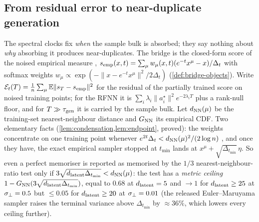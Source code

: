 \subsection{From residual error to near-duplicate generation}
\label{sec:theory-bridge}\label{sec:theory-fraction}\label{sec:theory-mem}

The spectral clocks fix \emph{when} the sample bulk is absorbed; they say nothing about \emph{why} absorbing it produces near-duplicates. The bridge is the closed-form score of the noised empirical measure \citep{scarvelis2023closedform,gu2023memorization}, $s_{\rm emp}(x,t)=\sum_\mu w_\mu(x,t)(e^{-t}x^\mu-x)/\Delta_t$ with softmax weights $w_\mu\propto\exp(-\|x-e^{-t}x^\mu\|^2/2\Delta_t)$ (\cref{def:bridge-objects}). Write $\mathcal E_t(T)=\tfrac1{n}\sum_\mu\mathbb{E}\|s_T-s_{\rm emp}\|^2$ for the residual of the partially trained score on noised training points; for the RFNN it is $\sum_i\lambda_i\|a_i^\star\|^2e^{-2\lambda_iT}$ plus a rank-null floor, and for $T\gg\tau_{\mathrm{gen}}$ it is carried by the sample bulk. Let $d_{\rm NN}(\mu)$ be the training-set nearest-neighbour distance and $G_{\rm NN}$ its empirical CDF. Two elementary facts (\cref{lem:condensation,lem:endpoint}, proved): the weights concentrate on one training point whenever $e^{2t}\Delta_t<d_{\rm NN}(\mu)^2/(2\log n)$ \citep{biroli2024dynamical}, and once they have, the exact empirical sampler stopped at $t_{\min}$ lands at $x^\mu+\sqrt{\Delta_{t_{\min}}}\,\eta$. So even a perfect memoriser is reported as memorised by the $1/3$ nearest-neighbour-ratio test \citep{somepalli2023diffusion} only if $3\sqrt{d_{\mathrm{latent}}\Delta_{t_{\min}}}<d_{\rm NN}(\mu)$: the test has a \emph{metric ceiling} $1-G_{\rm NN}(3\sqrt{d_{\mathrm{latent}}\Delta_{t_{\min}}})$, equal to $0.68$ at $d_{\mathrm{latent}}=5$ and $\to1$ for $d_{\mathrm{latent}}\ge25$ at $\sigma_{\perp}=0.5$ but $\le0.05$ for $d_{\mathrm{latent}}\ge20$ at $\sigma_{\perp}=0.01$ (the released Euler--Maruyama sampler raises the terminal variance above $\Delta_{t_{\min}}$ by $\approx36\%$, which lowers every ceiling further).

